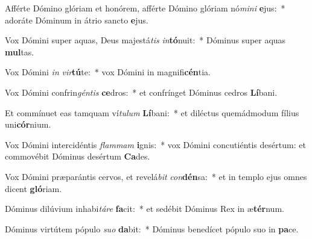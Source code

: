 \item Afférte Dómino glóriam et honórem, afférte Dómino glóriam nó\textit{mi}\textit{ni} \textbf{e}jus:~* adoráte Dóminum in átrio sancto \textbf{e}jus.
\item Vox Dómini super aquas, Deus majestá\textit{tis} \textit{in}\textbf{tó}nuit:~* Dóminus super aquas \textbf{mul}tas.
\item Vox Dómini \textit{in} \textit{vir}\textbf{tú}te:~* vox Dómini in magnifi\textbf{cén}tia.
\item Vox Dómini confrin\textit{gén}\textit{tis} \textbf{ce}dros:~* et confrínget Dóminus cedros \textbf{Lí}bani.
\item Et commínuet eas tamquam ví\textit{tu}\textit{lum} \textbf{Lí}bani:~* et diléctus quemádmodum fílius uni\textbf{cór}nium.
\item Vox Dómini intercidéntis \textit{flam}\textit{mam} \textbf{i}gnis:~* vox Dómini concutiéntis desértum: et commovébit Dóminus desértum \textbf{Ca}des.
\item Vox Dómini præparántis cervos, et revelá\textit{bit} \textit{con}\textbf{dén}sa:~* et in templo ejus omnes dicent \textbf{gló}riam.
\item Dóminus dilúvium inhabi\textit{tá}\textit{re} \textbf{fa}cit:~* et sedébit Dóminus Rex in æ\textbf{tér}num.
\item Dóminus virtútem pópulo \textit{su}\textit{o} \textbf{da}bit:~* Dóminus benedícet pópulo suo in \textbf{pa}ce.
